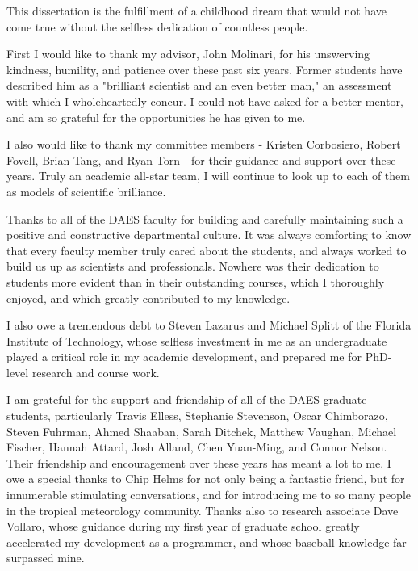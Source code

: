  


\indent \indent This dissertation is the fulfillment of a childhood dream that would not have come true without the selfless dedication of countless people.

First I would like to thank my advisor, John Molinari, for his unswerving kindness, humility, and patience over these past six years.  
Former students have described him as a "brilliant scientist and an even better man," an assessment with which I wholeheartedly concur.  
I could not have asked for a better mentor, and am so grateful for the opportunities he has given to me.

I also would like to thank my committee members - Kristen Corbosiero, Robert Fovell, Brian Tang, and Ryan Torn - for their guidance and support over these years.  
Truly an academic all-star team, I will continue to look up to each of them as models of scientific brilliance.

Thanks to all of the DAES faculty for building and carefully maintaining such a positive and constructive departmental culture.  
It was always comforting to know that every faculty member truly cared about the students, and always worked to build us up as scientists and professionals.  
Nowhere was their dedication to students more evident than in their outstanding courses, which I thoroughly enjoyed, and which greatly contributed to my knowledge.  

I also owe a tremendous debt to Steven Lazarus and Michael Splitt of the Florida Institute of Technology, whose selfless investment in me as an undergraduate played a critical role in my academic development, and prepared me for PhD-level research and course work.

I am grateful for the support and friendship of all of the DAES graduate students, particularly Travis Elless, Stephanie Stevenson, Oscar Chimborazo, Steven Fuhrman, Ahmed Shaaban, Sarah Ditchek, Matthew Vaughan, Michael Fischer, Hannah Attard, Josh Alland, Chen Yuan-Ming, and Connor Nelson.  
Their friendship and encouragement over these years has meant a lot to me.
I owe a special thanks to Chip Helms for not only being a fantastic friend, but for innumerable stimulating conversations, and for introducing me to so many people in the tropical meteorology community.  
Thanks also to research associate Dave Vollaro, whose guidance during my first year of graduate school greatly accelerated my development as a programmer, and whose baseball knowledge far surpassed mine.

